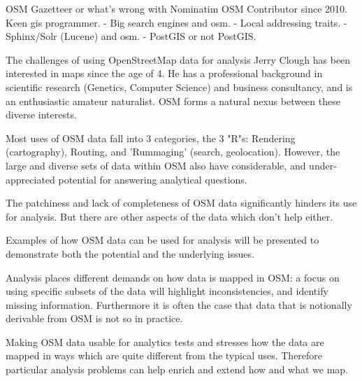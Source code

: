 %
{OSM Gazetteer or what's wrong with Nominatim}%
{OSM Contributor since 2010. Keen gis programmer. }%
{- Big search engines and osm. - Local addressing traits. - Sphinx/Solr (Lucene) and osm. - PostGIS or not PostGIS. }

%
{The challenges of using OpenStreetMap data for analysis}%
{Jerry Clough has been interested in maps since the age of 4. He has a professional background in scientific research (Genetics, Computer Science) and business consultancy, and is an enthusiastic amateur naturalist. OSM forms a natural nexus between these diverse interests. }%
{Most uses of OSM data fall into 3 categories, the 3 "R"s: Rendering (cartography), Routing, and 'Rummaging' (search, geolocation). However, the large and diverse sets of data within OSM also have considerable, and under-appreciated potential for answering analytical questions.

The patchiness and lack of completeness of OSM data significantly hinders its use for analysis.  But there are other aspects of the data which don't help either.

Examples of how OSM data can be used for analysis will be presented to demonstrate both the potential and the underlying issues.

Analysis places different demands on how data is mapped in OSM: a focus on using specific subsets of the data will highlight inconsistencies, and identify missing information. Furthermore it is often the case that data that is notionally derivable from OSM is not so in practice. 

Making OSM data usable for analytics tests and stresses how the data are mapped in ways which are quite different from the typical uses. Therefore particular analysis problems can help enrich and extend how and what we map.}
